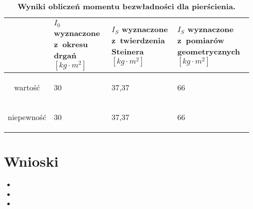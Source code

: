 \documentclass[a4paper,11pt]{article}
\begin{document}
\begin{table}[ht]
\centering
\caption{\textbf{Wyniki obliczeń momentu bezwładności dla pierścienia.}}
\begin{tabular}{|c|m{30mm}|m{30mm}|m{30mm}|}
\hline
& $I_{0}$ wyznaczone z~okresu drgań $[kg\cdot m^{2}]$ & $I_{S}$ wyznaczone z~twierdzenia Steinera $[kg\cdot m^{2}]$ & $I_{S}$ wyznaczone z~pomiarów geometrycznych $[kg\cdot m^{2}]$  \\ \hline
wartość & \begin{center}30\end{center} & \begin{center}37,37\end{center} & \begin{center}66\end{center}\\ \hline
niepewność &\begin{center}30\end{center} & \begin{center}37,37\end{center} & \begin{center}66\end{center}\\ \hline

\end{tabular}
\end{table}



\section{Wnioski}
\begin{itemize}
\item 
\item 
\item  
\end{itemize}
\end{document}
